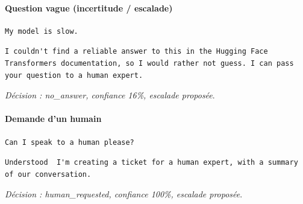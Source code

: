\paragraph{Question vague (incertitude / escalade)}
\begin{lstlisting}
My model is slow.
\end{lstlisting}
\begin{lstlisting}[backgroundcolor=\color{black!5}]
I couldn't find a reliable answer to this in the Hugging Face Transformers documentation, so I would rather not guess. I can pass your question to a human expert.
\end{lstlisting}
\noindent\textit{Décision : no\_answer, confiance 16\%, escalade proposée}.

\paragraph{Demande d'un humain}
\begin{lstlisting}
Can I speak to a human please?
\end{lstlisting}
\begin{lstlisting}[backgroundcolor=\color{black!5}]
Understood  I'm creating a ticket for a human expert, with a summary of our conversation.
\end{lstlisting}
\noindent\textit{Décision : human\_requested, confiance 100\%, escalade proposée}.

